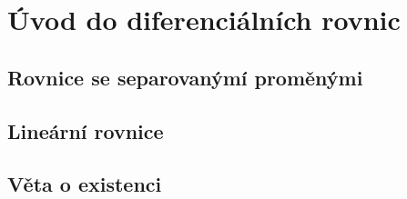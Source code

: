 \documentclass[../main.tex]{subfiles}
\begin{document}
\section{Úvod do diferenciálních rovnic}
\subsection{Rovnice se separovanýmí proměnými}
\subsection{Lineární rovnice}
\subsection{Věta o existenci}
\end{document}
